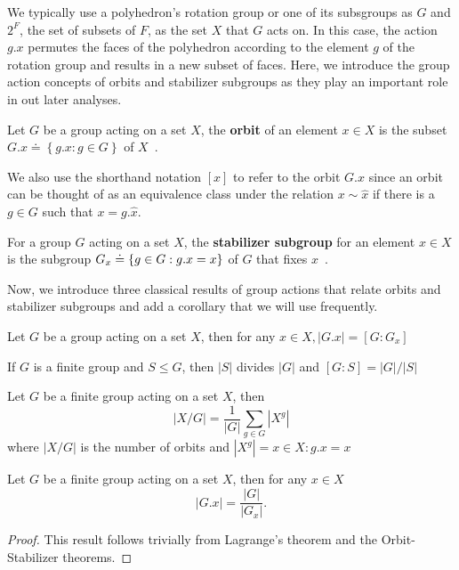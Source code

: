 We typically use a polyhedron's rotation group or one of its subsgroups as $G$ and $2^F$, the set of subsets of $F$, as the set $X$ that $G$ acts on. In this case, the action $g.x$ permutes the faces of the polyhedron according to the element $g$ of the rotation group and results in a new subset of faces. Here, we introduce the group action concepts of orbits and stabilizer subgroups as they play an important role in out later analyses. 
\begin{mydef}%
Let $G$ be a group acting on a set $X$, the \textbf{orbit} of an element $x \in X$ is the subset $G.x \doteq \left\{g.x : g \in G \right\}$ of $X$~\cite{Rotman1995}.
\end{mydef}
We also use the shorthand notation $[x]$ to refer to the orbit $G.x$ since an orbit can be thought of as an equivalence class under the relation $x \sim \hat{x}$ if there is a $g \in G$ such that $x = g.\hat{x}$. 
\begin{mydef}%
For a  group $G$ acting on a set $X$, the \textbf{stabilizer subgroup} for an element $x\in X$ is the subgroup $G_x \doteq \left\{g \in {G} :g. x = x \right\}$ of $G$ that fixes $x$~\cite{Rotman1995}.
\end{mydef}
Now, we introduce three classical results of group actions that relate orbits and stabilizer subgroups and add a corollary that we will use frequently.
\begin{mythm}
Let $G$ be a group acting on a set $X$, then for any $x \in X, |G.x| = [G:G_x]$   
\end{mythm}
\begin{mythm}
If $G$ is a finite group and $S \leq G$, then $|S|$ divides $|G|$ and $[G:S] = |G|/|S|$
\end{mythm}
\begin{mylem}
Let $G$ be a finite group acting on a set $X$, then $$|X/G| = \frac{1}{|G|}\sum_{g \in G}|X^g|$$ where $|X/G|$ is the number of orbits and $|X^g| = {x \in X : g.x = x}$ 
\end{mylem}

\begin{mycor}
\label{cor:OST}
Let $G$ be a finite group acting on a set $X$, then for any $x \in X$ $$|G.x| = \frac{|G|}{|G_x|}.$$
\end{mycor}
\begin{proof}
This result follows trivially from Lagrange's theorem and the Orbit-Stabilizer theorems. 
\end{proof}

